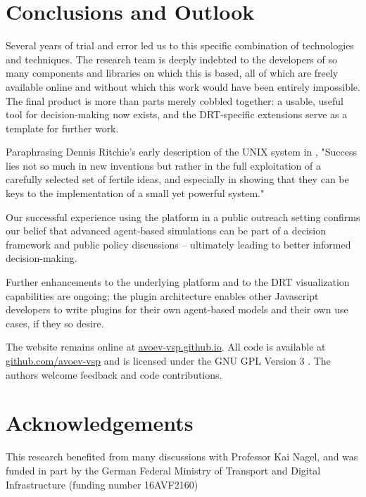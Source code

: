 \section{Conclusions and Outlook}
\label{conclusions}

Several years of trial and error led us to this specific combination of technologies and techniques. The research team is deeply indebted to the developers of so many components and libraries on which this is based, all of which are freely available online and without which this work would have been entirely impossible. The final product is more than parts merely cobbled together: a usable, useful tool for decision-making now exists, and the DRT-specific extensions serve as a template for further work.

Paraphrasing Dennis Ritchie's early description of the UNIX system in \citet{Ritchie1978unix}, "Success lies not so much in new inventions but rather in the full exploitation of a carefully selected set of fertile ideas, and especially in showing that they can be keys to the implementation of a small yet powerful system."

Our successful experience using the platform in a public outreach setting confirms our belief that advanced agent-based simulations can be part of a decision framework and public policy discussions -- ultimately leading to better informed decision-making.

Further enhancements to the underlying platform and to the DRT visualization capabilities are ongoing; the plugin architecture enables other Javascript developers to write plugins for their own agent-based models and their own use cases, if they so desire.

The website remains online at \href{https://avoev-vsp.github.io}{avoev-vsp.github.io}. All code is available at \href{https://github.com/avoev-vsp/avoev-vsp.github.io}{github.com/avoev-vsp} and is licensed under the GNU GPL Version 3 \cite{FSF2007GnuGPL}. The authors welcome feedback and code contributions.

\section{Acknowledgements}
This research benefited from many discussions with Professor Kai Nagel, and was funded in part by the German Federal Ministry of Transport and Digital Infrastructure (funding number 16AVF2160)
